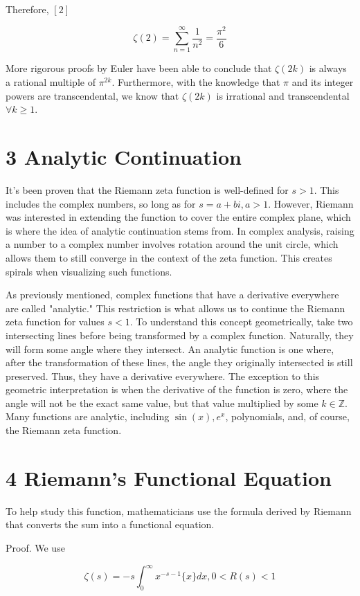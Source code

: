 \documentclass[10pt]{article}
\begin{document}
Therefore, $[2]$

$$
\zeta(2)=\sum_{n=1}^{\infty} \frac{1}{n^{2}}=\frac{\pi^{2}}{6}
$$

More rigorous proofs by Euler have been able to conclude that $\zeta(2 k)$ is always a rational multiple of $\pi^{2 k}$. Furthermore, with the knowledge that $\pi$ and its integer powers are transcendental, we know that $\zeta(2 k)$ is irrational and transcendental $\forall k \geq 1$.

\section*{3 Analytic Continuation}
It's been proven that the Riemann zeta function is well-defined for $s>1$. This includes the complex numbers, so long as for $s=a+b i, a>1$. However, Riemann was interested in extending the function to cover the entire complex plane, which is where the idea of analytic continuation stems from. In complex analysis, raising a number to a complex number involves rotation around the unit circle, which allows them to still converge in the context of the zeta function. This creates spirals when visualizing such functions.

As previously mentioned, complex functions that have a derivative everywhere are called "analytic." This restriction is what allows us to continue the Riemann zeta function for values $s<1$. To understand this concept geometrically, take two intersecting lines before being transformed by a complex function. Naturally, they will form some angle where they intersect. An analytic function is one where, after the transformation of these lines, the angle they originally intersected is still preserved. Thus, they have a derivative everywhere. The exception to this geometric interpretation is when the derivative of the function is zero, where the angle will not be the exact same value, but that value multiplied by some $k \in \mathbb{Z}$. Many functions are analytic, including $\sin (x), e^{x}$, polynomials, and, of course, the Riemann zeta function.

\section*{4 Riemann's Functional Equation}
To help study this function, mathematicians use the formula derived by Riemann that converts the sum into a functional equation.

Proof. We use

$$
\zeta(s)=-s \int_{0}^{\infty} x^{-s-1}\{x\} d x, 0<R(s)<1
$$
\end{document}
